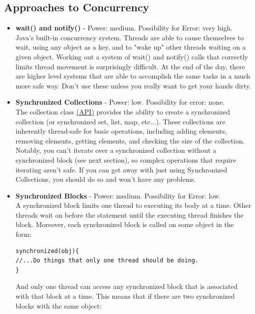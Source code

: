 \documentclass[11pt]{article}
\begin{document}
\subsection{Approaches to Concurrency}
\begin{itemize}
\item \textbf{wait() and notify()} - Power: medium. Possibility for Error: very
	high.\\
	Java's built-in concurrency system. Threads are able to cause themselves to
	wait, using any object as a key, and to "wake up" other threads waiting on a
	given object. Working out a system of wait() and notify() calls that
	correctly limits thread movement is surprisingly difficult. At the end of
	the day, there are higher level systems that are able to accomplish the same
	tasks in a much more safe way. Don't use these unless you really want to get
	your hands dirty.
\item \textbf{Synchronized Collections} - Power: low. Possibility for error:
	none. \\
	The collection class
	\href{http://docs.oracle.com/javase/7/docs/api/java/util/Collections.html\#synchronizedCollection(java.util.Collection)}{({\color{blue}\underline{API}})}
	provides the ability to create a synchronized collection (or synchronized
	set, list, map, etc...). These collections are inherently thread-safe for
	basic operations, including adding elements, removing elements, getting
	elements, and checking the size of the collection. Notably, you can't
	iterate over a synchronized collection without a synchronized block (see
	next section), so complex operations that require iterating aren't safe. If
	you can get away with just using Synchronized Collections, you should do so
	and won't have any problems.
\item \textbf{Synchronized Blocks} - Power: medium. Possibility for Error:
	low.\\
	A synchronized block limits one thread to executing its body at a time.
	Other threads wait on before the statement until the executing thread
	finishes the block. Moreover, each synchronized block is called on some
	object in the form:
\begin{lstlisting}[frame=single]
synchronized(obj){
//...Do things that only one thread should be doing.
}
\end{lstlisting}
And only one thread can access any synchronized block that is associated with
that block at a time. This means that if there are two synchronized blocks with
the same object:
\begin{lstlisting}[frame=single]

\end{lstlisting}
\end{itemize}
\end{document}
